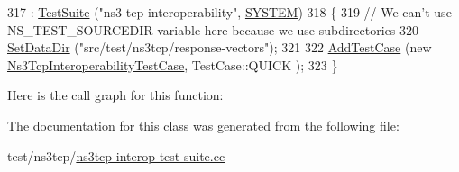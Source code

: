 \begin{DoxyCode}
317   : \hyperlink{classns3_1_1TestSuite_a904b0c40583b744d30908aeb94636d1a}{TestSuite} (\textcolor{stringliteral}{"ns3-tcp-interoperability"}, \hyperlink{classns3_1_1TestSuite_a1ebfcab34ec8161e085e8e3a1855eae0a90c5529a26ab3a5ffcc6e57040dbd82e}{SYSTEM})
318 \{
319   \textcolor{comment}{// We can't use NS\_TEST\_SOURCEDIR variable here because we use subdirectories}
320   \hyperlink{classns3_1_1TestCase_ab002fb0e5071fcde71a92ca9e8224b23}{SetDataDir} (\textcolor{stringliteral}{"src/test/ns3tcp/response-vectors"});
321   
322   \hyperlink{classns3_1_1TestCase_a3718088e3eefd5d6454569d2e0ddd835}{AddTestCase} (\textcolor{keyword}{new} \hyperlink{classNs3TcpInteroperabilityTestCase}{Ns3TcpInteroperabilityTestCase}, TestCase::QUICK
      );
323 \}
\end{DoxyCode}


Here is the call graph for this function\+:




The documentation for this class was generated from the following file\+:\begin{DoxyCompactItemize}
\item 
test/ns3tcp/\hyperlink{ns3tcp-interop-test-suite_8cc}{ns3tcp-\/interop-\/test-\/suite.\+cc}\end{DoxyCompactItemize}
